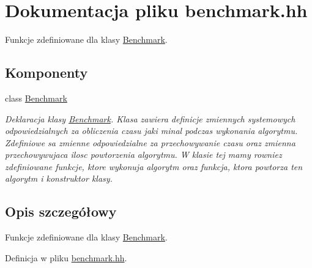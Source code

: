 \hypertarget{benchmark_8hh}{\section{\-Dokumentacja pliku benchmark.\-hh}
\label{benchmark_8hh}
}


\-Funkcje zdefiniowane dla klasy \hyperlink{class_benchmark}{\-Benchmark}.  


\subsection*{\-Komponenty}
\begin{DoxyCompactItemize}
\item 
class \hyperlink{class_benchmark}{\-Benchmark}
\begin{DoxyCompactList}\small\item\em \-Deklaracja klasy \hyperlink{class_benchmark}{\-Benchmark}. \-Klasa zawiera definicje zmiennych systemowych odpowiedzialnych za obliczenia czasu jaki minal podczas wykonania algorytmu. \-Zdefiniowe sa zmienne odpowiedzialne za przechowywanie czasu oraz zmienna przechowywujaca ilosc powtorzenia algorytmu. \-W klasie tej mamy rowniez zdefiniowane funkcje, ktore wykonuja algorytm oraz funkcja, ktora powtorza ten algorytm i konstruktor klasy. \end{DoxyCompactList}\end{DoxyCompactItemize}


\subsection{\-Opis szczegółowy}
\-Funkcje zdefiniowane dla klasy \hyperlink{class_benchmark}{\-Benchmark}. 

\-Definicja w pliku \hyperlink{benchmark_8hh_source}{benchmark.\-hh}.

